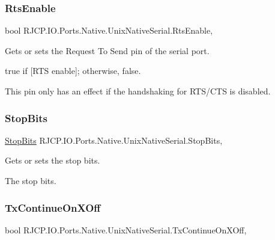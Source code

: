 \subsubsection{\texorpdfstring{RtsEnable}{RtsEnable}}
{\footnotesize\ttfamily bool R\+J\+C\+P.\+I\+O.\+Ports.\+Native.\+Unix\+Native\+Serial.\+Rts\+Enable\hspace{0.3cm}{\ttfamily [get]}, {\ttfamily [set]}}



Gets or sets the Request To Send pin of the serial port. 

{\ttfamily true} if \mbox{[}R\+TS enable\mbox{]}; otherwise, {\ttfamily false}. 

This pin only has an effect if the handshaking for R\+T\+S/\+C\+TS is disabled. \mbox{\label{class_r_j_c_p_1_1_i_o_1_1_ports_1_1_native_1_1_unix_native_serial_a7b3ab175cabde13e9846111dce225ab6}} 
\subsubsection{\texorpdfstring{StopBits}{StopBits}}
{\footnotesize\ttfamily \mbox{\hyperlink{namespace_r_j_c_p_1_1_i_o_1_1_ports_a56a13b591d46736acafe20f2976c84fa}{Stop\+Bits}} R\+J\+C\+P.\+I\+O.\+Ports.\+Native.\+Unix\+Native\+Serial.\+Stop\+Bits\hspace{0.3cm}{\ttfamily [get]}, {\ttfamily [set]}}



Gets or sets the stop bits. 

The stop bits. \mbox{\label{class_r_j_c_p_1_1_i_o_1_1_ports_1_1_native_1_1_unix_native_serial_a0a50e40fc2a389dd7c80fb0384e8c6b7}} 
\subsubsection{\texorpdfstring{TxContinueOnXOff}{TxContinueOnXOff}}
{\footnotesize\ttfamily bool R\+J\+C\+P.\+I\+O.\+Ports.\+Native.\+Unix\+Native\+Serial.\+Tx\+Continue\+On\+X\+Off\hspace{0.3cm}{\ttfamily [get]}, {\ttfamily [set]}}



